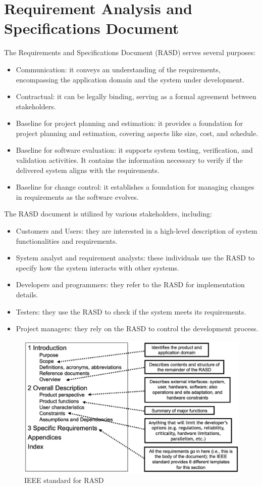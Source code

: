 \section{Requirement Analysis and Specifications Document}

The Requirements and Specifications Document (RASD) serves several purposes:
\begin{itemize}
    \item Communication: it conveys an understanding of the requirements, encompassing the application domain and the system under development.
    \item Contractual: it can be legally binding, serving as a formal agreement between stakeholders.
    \item Baseline for project planning and estimation: it provides a foundation for project planning and estimation, covering aspects like size, cost, and schedule.
    \item Baseline for software evaluation: it supports system testing, verification, and validation activities. 
        It contains the information necessary to verify if the delivered system aligns with the requirements.
    \item Baseline for change control: it establishes a foundation for managing changes in requirements as the software evolves.
\end{itemize}
The RASD document is utilized by various stakeholders, including:
\begin{itemize}
    \item Customers and Users: they are interested in a high-level description of system functionalities and requirements.
    \item System analyst and requirement analysts: these individuals use the RASD to specify how the system interacts with other systems.
    \item Developers and programmers: they refer to the RASD for implementation details.
    \item Testers: they use the RASD to check if the system meets its requirements.
    \item Project managers: they rely on the RASD to control the development process.
\end{itemize}
\begin{figure}[H]
    \centering
    \includegraphics[width=0.5\linewidth]{images/RASD.png}
    \caption{IEEE standard for RASD}
\end{figure}